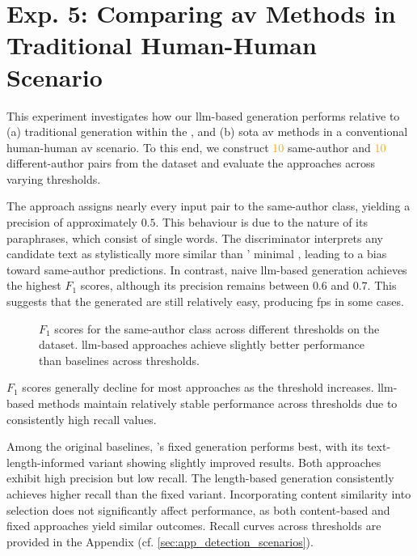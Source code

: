 \section{Exp. 5: Comparing \acs{av} Methods in Traditional Human-Human Scenario}
\label{sec:results_trad_av}


This experiment investigates how our \ac{llm}-based \imp{} generation performs relative to (a) traditional \imp{} generation within the \impAppr{}, and (b) \acl{sota} \ac{av} methods in a conventional human-human \ac{av} scenario. 
To this end, we construct \textcolor{orange}{10} same-author and \textcolor{orange}{10} different-author pairs from the \dataStudent{} dataset and evaluate the approaches across varying thresholds.

The \mirrorMinds{} approach assigns nearly every input pair to the same-author class, yielding a precision of approximately $0.5$. 
This behaviour is due to the nature of its paraphrases, which consist of single words. 
The discriminator interprets any candidate text as stylistically more similar than \mirrorMinds{}' minimal \imps{}, leading to a bias toward same-author predictions. 
In contrast, naive \ac{llm}-based \imp{} generation achieves the highest $F_1$ scores, although its precision remains between $0.6$ and $0.7$. 
This suggests that the generated \imps{} are still relatively easy, producing \acp{fp} in some cases.

\begin{figure}[h]
\centering
    
  \caption[Traditional \ac{av} $F_1$ scores.]{$F_1$ scores for the same-author class across different thresholds on the \dataStudent{} dataset. 
\ac{llm}-based approaches achieve slightly better performance than baselines across thresholds.}
  \label{fig:human-human_f1}
\end{figure}

$F_1$ scores generally decline for most approaches as the threshold increases. 
\ac{llm}-based methods maintain relatively stable performance across thresholds due to consistently high recall values. 

Among the original baselines, \citet{koppel_determining_2014}'s fixed \imp{} generation performs best, with its text-length-informed variant showing slightly improved results. 
Both approaches exhibit high precision but low recall. 
The length-based \imp{} generation consistently achieves higher recall than the fixed variant. 
Incorporating content similarity into \imp{} selection does not significantly affect performance, as both content-based and fixed \imp{} approaches yield similar outcomes. 
Recall curves across thresholds are provided in the Appendix (cf. \autoref{sec:app_detection_scenarios}).
